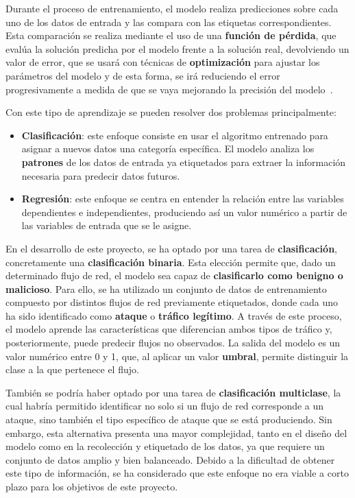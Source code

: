 Durante el proceso de entrenamiento, el modelo realiza predicciones sobre cada uno de los datos de entrada y las compara con las etiquetas correspondientes. Esta comparación se realiza mediante el uso de una \textbf{función de pérdida}, que evalúa la solución predicha por el modelo frente a la solución real, devolviendo un valor de error, que se usará con técnicas de \textbf{optimización} para ajustar los parámetros del modelo y de esta forma, se irá reduciendo el error progresivamente a medida de que se vaya mejorando la precisión del modelo~\cite{aprendizaje_supervisado}.

Con este tipo de aprendizaje se pueden resolver dos problemas principalmente:
\begin{itemize}
    \item \textbf{Clasificación}: este enfoque consiste en usar el algoritmo entrenado para asignar a nuevos datos una categoría específica. El modelo analiza los \textbf{patrones} de los datos de entrada ya etiquetados para extraer la información necesaria para predecir datos futuros.
    \item \textbf{Regresión}: este enfoque se centra en entender la relación entre las variables dependientes e independientes, produciendo así un valor numérico a partir de las variables de entrada que se le asigne. 
\end{itemize}

En el desarrollo de este proyecto, se ha optado por una tarea de \textbf{clasificación}, concretamente una \textbf{clasificación binaria}. Esta elección permite que, dado un determinado flujo de red, el modelo sea capaz de \textbf{clasificarlo como benigno o malicioso}. Para ello, se ha utilizado un conjunto de datos de entrenamiento compuesto por distintos flujos de red previamente etiquetados, donde cada uno ha sido identificado como \textbf{ataque} o \textbf{tráfico legítimo}. A través de este proceso, el modelo aprende las características que diferencian ambos tipos de tráfico y, posteriormente, puede predecir flujos no observados. La salida del modelo es un valor numérico entre 0 y 1, que, al aplicar un valor \textbf{umbral}, permite distinguir la clase a la que pertenece el flujo.

También se podría haber optado por una tarea de \textbf{clasificación multiclase}, la cual habría permitido identificar no solo si un flujo de red corresponde a un ataque, sino también el tipo específico de ataque que se está produciendo. Sin embargo, esta alternativa presenta una mayor complejidad, tanto en el diseño del modelo como en la recolección y etiquetado de los datos, ya que requiere un conjunto de datos amplio y bien balanceado. Debido a la dificultad de obtener este tipo de información, se ha considerado que este enfoque no era viable a corto plazo para los objetivos de este proyecto.

